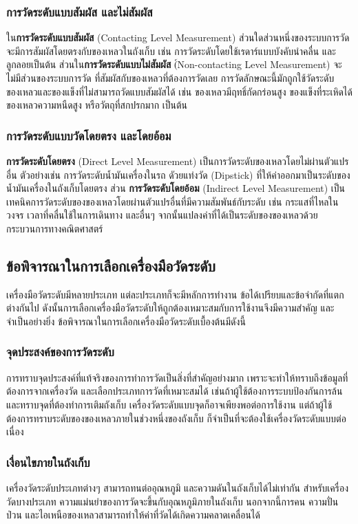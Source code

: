 \documentclass[final,11pt]{article}
\begin{document}
\subsubsection{การวัดระดับแบบสัมผัส และไม่สัมผัส}
ใน\textbf{การวัดระดับแบบสัมผัส} (Contacting Level Measurement) ส่วนใดส่วนหนึ่งของระบบการวัด จะมีการสัมผัสโดยตรงกับของเหลวในถังเก็บ
เช่น การวัดระดับโดยใช้เรดาร์แบบบังคับนำคลื่น และลูกลอยเป็นต้น ส่วนใน\textbf{การวัดระดับแบบไม่สัมผัส} (์Non-contacting Level Measurement)
จะไม่มีส่วนของระบบการวัด ที่สัมผัสกับของเหลวที่ต้องการวัดเลย การวัดลักษณะนี้มักถูกใช้วัดระดับของเหลวและของแข็งที่ไม่สามารถวัดแบบสัมผัสได้ เช่น
ของเหลวมีฤทธิ์กัดกร่อนสูง ของแข็งที่ระเหิดได้ ของเหลวความหนืดสูง หรือวัตถุที่สกปรกมาก เป็นต้น
\subsubsection{การวัดระดับแบบวัดโดยตรง และโดยอ้อม}
\textbf{การวัดระดับโดยตรง} (Direct Level Measurement) เป็นการวัดระดับของเหลวโดยไม่ผ่านตัวแปรอื่น ตัวอย่างเช่น
 การวัดระดับน้ำมันเครื่องในรถ ดัวยแท่งวัด (Dipstick) ที่ให้ค่าออกมาเป็นระดับของน้ำมันเครื่องในถังเก็บโดยตรง 
 ส่วน \textbf{การวัดระดับโดยอ้อม} (Indirect Level Measurement) เป็นเทคนิคการวัดระดับของของเหลวโดยผ่านตัวแปรอื่นที่มีความสัมพันธ์กับระดับ เช่น กระแสที่ไหลในวงจร 
 เวลาที่คลื่นใช้ในการเดินทาง และอื่นๆ จากนั้นแปลงค่าที่ได้เป็นระดับของของเหลวด้วยกระบวนการทางคณิตศาสตร์
\subsection{ข้อพิจารณาในการเลือกเครื่องมือวัดระดับ}
เครื่องมือวัดระดับมีหลายประเภท แต่ละประเภทก็จะมีหลักการทำงาน ข้อได้เปรียบและข้อจำกัดที่แตกต่างกันไป 
ดังนั้นการเลือกเครื่องมือวัดระดับให้ถูกต้องเหมาะสมกับการใช้งานจึงมีความสำคัญ และจำเป็นอย่างยิ่ง ข้อพิจารณาในการเลือกเครื่องมือวัดระดับเบื้องต้นมีดังนี้
\subsubsection{จุดประสงค์ของการวัดระดับ} 
การทราบจุดประสงค์ที่แท้จริงของการทำการวัดเป็นสิ่งที่สำคัญอย่างมาก เพราะจะทำให้ทราบถึงข้อมูลที่ต้องการจากเครื่องวัด และเลือกประเภทการวัดที่เหมาะสมได้
เช่นถ้าผู้ใช้ต้องการระบบป้องกันการล้น และทราบจุดที่ต้องทำการเติมถังเก็บ เครื่องวัดระดับแบบจุดก็อาจเพียงพอต่อการใช้งาน 
แต่ถ้าผู้ใช้ต้องการทราบระดับของของเหลวภายในช่วงหนึ่งของถังเก็บ ก็จำเป็นที่จะต้องใช้เครื่องวัดระดับแบบต่อเนื่อง
\subsubsection{เงื่อนไขภายในถังเก็บ}
เครื่องวัดระดับประเภทต่างๆ สามารถทนต่ออุณหภูมิ และความดันในถังเก็บได้ไม่เท่ากัน สำหรับเครื่องวัดบางประเภท ความแม่นยำของการวัดจะขึ้นกับอุณหภูมิภายในถังเก็บ
นอกจากนี้การคน ความปั่นป่วน และไอเหนือของเหลวสามารถทำให้ค่าที่วัดได้เกิดความคลาดเคลื่อนได้ 
\end{document}
